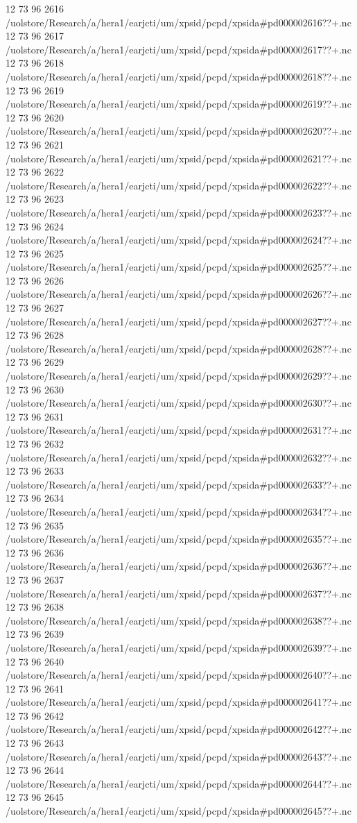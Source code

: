 12 73 96
2616
/uolstore/Research/a/hera1/earjcti/um/xpsid/pcpd/xpsida#pd000002616??+.nc
12 73 96
2617
/uolstore/Research/a/hera1/earjcti/um/xpsid/pcpd/xpsida#pd000002617??+.nc
12 73 96
2618
/uolstore/Research/a/hera1/earjcti/um/xpsid/pcpd/xpsida#pd000002618??+.nc
12 73 96
2619
/uolstore/Research/a/hera1/earjcti/um/xpsid/pcpd/xpsida#pd000002619??+.nc
12 73 96
2620
/uolstore/Research/a/hera1/earjcti/um/xpsid/pcpd/xpsida#pd000002620??+.nc
12 73 96
2621
/uolstore/Research/a/hera1/earjcti/um/xpsid/pcpd/xpsida#pd000002621??+.nc
12 73 96
2622
/uolstore/Research/a/hera1/earjcti/um/xpsid/pcpd/xpsida#pd000002622??+.nc
12 73 96
2623
/uolstore/Research/a/hera1/earjcti/um/xpsid/pcpd/xpsida#pd000002623??+.nc
12 73 96
2624
/uolstore/Research/a/hera1/earjcti/um/xpsid/pcpd/xpsida#pd000002624??+.nc
12 73 96
2625
/uolstore/Research/a/hera1/earjcti/um/xpsid/pcpd/xpsida#pd000002625??+.nc
12 73 96
2626
/uolstore/Research/a/hera1/earjcti/um/xpsid/pcpd/xpsida#pd000002626??+.nc
12 73 96
2627
/uolstore/Research/a/hera1/earjcti/um/xpsid/pcpd/xpsida#pd000002627??+.nc
12 73 96
2628
/uolstore/Research/a/hera1/earjcti/um/xpsid/pcpd/xpsida#pd000002628??+.nc
12 73 96
2629
/uolstore/Research/a/hera1/earjcti/um/xpsid/pcpd/xpsida#pd000002629??+.nc
12 73 96
2630
/uolstore/Research/a/hera1/earjcti/um/xpsid/pcpd/xpsida#pd000002630??+.nc
12 73 96
2631
/uolstore/Research/a/hera1/earjcti/um/xpsid/pcpd/xpsida#pd000002631??+.nc
12 73 96
2632
/uolstore/Research/a/hera1/earjcti/um/xpsid/pcpd/xpsida#pd000002632??+.nc
12 73 96
2633
/uolstore/Research/a/hera1/earjcti/um/xpsid/pcpd/xpsida#pd000002633??+.nc
12 73 96
2634
/uolstore/Research/a/hera1/earjcti/um/xpsid/pcpd/xpsida#pd000002634??+.nc
12 73 96
2635
/uolstore/Research/a/hera1/earjcti/um/xpsid/pcpd/xpsida#pd000002635??+.nc
12 73 96
2636
/uolstore/Research/a/hera1/earjcti/um/xpsid/pcpd/xpsida#pd000002636??+.nc
12 73 96
2637
/uolstore/Research/a/hera1/earjcti/um/xpsid/pcpd/xpsida#pd000002637??+.nc
12 73 96
2638
/uolstore/Research/a/hera1/earjcti/um/xpsid/pcpd/xpsida#pd000002638??+.nc
12 73 96
2639
/uolstore/Research/a/hera1/earjcti/um/xpsid/pcpd/xpsida#pd000002639??+.nc
12 73 96
2640
/uolstore/Research/a/hera1/earjcti/um/xpsid/pcpd/xpsida#pd000002640??+.nc
12 73 96
2641
/uolstore/Research/a/hera1/earjcti/um/xpsid/pcpd/xpsida#pd000002641??+.nc
12 73 96
2642
/uolstore/Research/a/hera1/earjcti/um/xpsid/pcpd/xpsida#pd000002642??+.nc
12 73 96
2643
/uolstore/Research/a/hera1/earjcti/um/xpsid/pcpd/xpsida#pd000002643??+.nc
12 73 96
2644
/uolstore/Research/a/hera1/earjcti/um/xpsid/pcpd/xpsida#pd000002644??+.nc
12 73 96
2645
/uolstore/Research/a/hera1/earjcti/um/xpsid/pcpd/xpsida#pd000002645??+.nc

